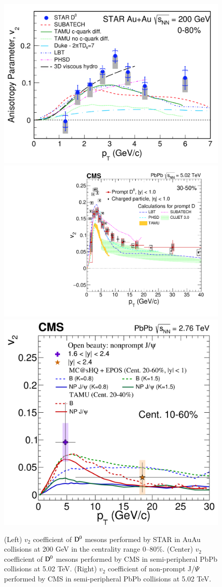 \documentclass{webofc}
\begin{document}
\begin{figure}[ht]
\centering
\includegraphics[width=.32\textwidth]{Plots/Dmesonv2STAR}
\includegraphics[width=.32\textwidth]{Plots/Dv2CMS3050.pdf}
\includegraphics[width=.32\textwidth]{Plots/v2NonPromptPbPbCMS.png}
\caption{(Left) $v_{2}$ coefficient of $\rm D^{0}$ mesons performed by STAR in AuAu collisions at 200 GeV in the centrality range 0--80$\%$.
(Center) $v_{2}$ coefficient of $\rm D^{0}$ mesons performed by CMS in semi-peripheral PbPb collisions at 5.02 TeV.
(Right) $v_{2}$ coefficient of non-prompt J/$\Psi$  performed by CMS in semi-peripheral PbPb collisions at 5.02 TeV.}
\label{fig:Dvn}     
\end{figure}
\end{document}

